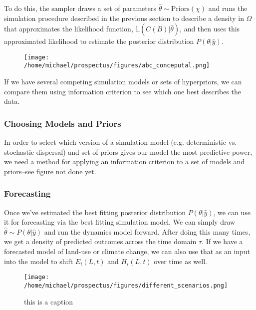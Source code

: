 \documentclass[]{article}
\begin{document}
To do this, the sampler draws a set of parameters
 $\hat{\theta} \sim \text{Priors}(\chi)$
and runs the simulation procedure described in the previous section to describe a density in
$\Omega$ that approximates the likelihood function,
$\mathbb{L}(C(B) | \hat{\theta})$, and then uses this approximated likelihood to estimate the posterior distribution
$P(\theta | \hat{y})$.

\begin{figure}[H]
\centering
\texttt{[image: /home/michael/prospectus/figures/abc\_conceputal.png]}
\caption{}
\end{figure}

If we have several competing simulation models or sets of hyperpriors, we can compare them using information criterion to see which one best describes the data.


\hypertarget{choosing-models-and-priors}{%
\subsubsection{Choosing Models and Priors}\label{choosing-models-and-priors}}

In order to select which version of a simulation model (e.g. deterministic vs. stochastic dispersal) and set of priors gives our model the most predictive power, we need a method for applying an information criterion to a set of models and priors--see figure not done yet.



\hypertarget{forecasting}{%
\subsubsection{Forecasting}\label{forecasting}}

Once we've estimated the best fitting posterior distribution $P(\theta | \hat{y})$, we can use it for forecasting via the best fitting simulation model. We can simply draw $\hat{\theta} \sim P(\theta | \hat{y})$ and run the dynamics model forward. After doing this many times, we get a density of predicted outcomes across the time domain $\tau$. If we have a forecasted model of land-use or climate change, we can also use that as an input into the model to shift $E_i(L, t)$ and $H_i(L,t)$ over time as well.

\begin{figure}[H]
\centering
\texttt{[image: /home/michael/prospectus/figures/different\_scenarios.png]}
\caption{this is a caption}
\end{figure}
\end{document}

